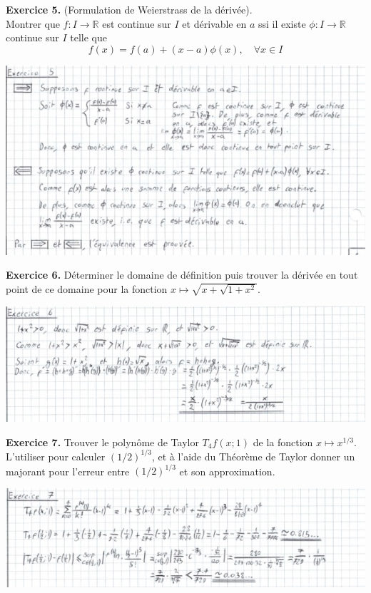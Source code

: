 \documentclass[a4paper, 10pt]{report}
\begin{document}
	\newpage
	
	\noindent
	\textbf{Exercice 5.} (Formulation de Weierstrass de la dérivée).\\
	Montrer que $f: I \to \mathbb{R}$ est continue sur $I$ et dérivable
	en $a$ ssi il existe $\phi: I \to \mathbb{R}$ continue sur $I$
	telle que \[f(x) = f(a) + (x - a) \phi(x), \quad \forall x \in I\]
	
	\includegraphics{ex05.jpg}	
		
	\vspace{5mm}
	\noindent
	\textbf{Exercice 6.} Déterminer le domaine de définition puis
	trouver la dérivée en tout point de ce domaine pour la fonction
	$x \mapsto \sqrt{x + \sqrt{1 + x^2}}$.
	
	\includegraphics{ex06.jpg}
		
	\vspace{5mm}	
	\noindent
	\textbf{Exercice 7.} Trouver le polynôme de Taylor $T_4f(x;1)$ de
	la fonction $x \mapsto x^{1/3}$. L'utiliser pour calculer
	$(1/2)^{1/3}$, et à l'aide du Théorème de Taylor donner un majorant
	pour l'erreur entre $(1/2)^{1/3}$ et son approximation.
	
	\includegraphics{ex07.jpg}
	
	

	
%	
%	
%	
	
\end{document}
